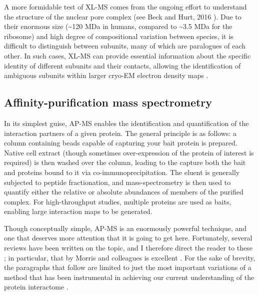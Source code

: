 \documentclass[a4paper,11pt,twoside,openright]{scrbook}
\begin{document}
A more formidable test of XL-MS comes from the ongoing effort to understand the structure of the nuclear pore complex (see Beck and Hurt, 2016 \cite{Beck2016}). Due to their enormous size (\textasciitilde 120 MDa in humans, compared to \textasciitilde 3.5 MDa for the ribosome) and high degree of compositional variation between species, it is difficult to distinguish between subunits, many of which are paralogues of each other. In such cases, XL-MS can provide essential information about the specific identity of different subunits and their contacts, allowing the identification of ambiguous subunits within larger cryo-EM electron density maps \cite{Bui2013,Shi2014a}.

\subsection{Affinity-purification mass spectrometry}
In its simplest guise, AP-MS enables the identification and quantification of the interaction partners of a given protein. The general principle is as follows: a column containing beads capable of capturing your bait protein is prepared. Native cell extract (though sometimes over-expression of the protein of interest is required) is then washed over the column, leading to the capture both the bait and proteins bound to it via co-immunoprecipitation. The eluent is generally subjected to peptide fractionation, and mass-spectrometry is then used to quantify either the relative or absolute abundances of members of the purified complex. For high-throughput studies, multiple proteins are used as baits, enabling large interaction maps to be generated.

Though conceptually simple, AP-MS is an enormously powerful technique, and one that deserves more attention that it is going to get here. Fortunately, several reviews have been written on the topic, and I therefore direct the reader to these \cite{Oeffinger2012,Morris2014,Aebersold2016}; in particular, that by Morris and colleagues is excellent \cite{Morris2014}. For the sake of brevity, the paragraphs that follow are limited to just the most important variations of a method that has been instrumental in achieving our current understanding of the protein interactome \cite{Malovannaya2011,Hein2015,Huttlin2015,Wan2015}.
\end{document}
